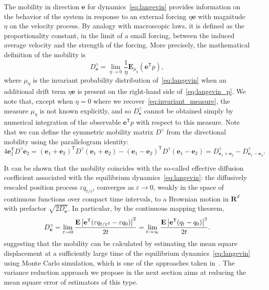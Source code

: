 \documentclass[11pt,a4paper]{article}
\newcommand{\expect}[0]{\mathbf{E}}
\newcommand{\real}{\mathbf R}
\newcommand{\vect}[1]{\boldsymbol{\mathbf #1}}
\renewcommand{\t}{\mathsf T}
\theoremstyle{plain}
\numberwithin{equation}{section}
\begin{document}
The mobility in direction $\vect e$ for dynamics~\eqref{eq:langevin} provides information on the behavior of the system
in response to an external forcing $\eta \vect e$ with magnitude~$\eta$ on the velocity process.
By analogy with macroscopic laws,
it is defined as the proportionality constant,
in the limit of a small forcing,
between the induced average velocity and the strength  of the forcing.
More precisely,
the mathematical definition of the mobility is
\[
    D^{\gamma}_{\vect e} = \lim_{\eta \to 0} \frac{1}{\eta}\expect_{\mu_{\eta}} (\vect e^\t p),
\]
where $\mu_{\eta}$ is the invariant probability distribution of~\eqref{eq:langevin} when
an additional drift term $\eta \vect e$ is present on the right-hand side of~\eqref{eq:langevin_p}.
We note that, except when $\eta = 0$ where we recover~\eqref{eq:invariant_measure},
the measure $\mu_{\eta}$ is not known explicitly,
and so $D^{\gamma}_{\vect e}$ cannot be obtained simply by numerical integration of the observable $\vect e^\t p$ with respect to this measure.
Note that we can define the symmetric mobility matrix $D^{\gamma}$ from the directional mobility
using the parallelogram identity:
\[
    4 \vect e_1^\t D^{\gamma} \vect e_2
    = (\vect e_1 + \vect e_2) ^\t D^{\gamma} (\vect e_1 + \vect e_2)
    - (\vect e_1 - \vect e_2) ^\t D^{\gamma} (\vect e_1 - \vect e_2)
    = D^{\gamma}_{\vect e_1 + \vect e_2} - D^{\gamma}_{\vect e_1 - \vect e_2}.
\]

It can be shown that the mobility coincides with the so-called effective diffusion coefficient associated with the equilibrium dynamics~\eqref{eq:langevin}:
the diffusively rescaled position process $\varepsilon q_{t/\varepsilon^2}$ converges as $\varepsilon \to 0$,
weakly in the space of continuous functions over compact time intervals,
to a Brownian motion in $\real^d$ with prefactor $\sqrt{2 D^{\gamma}_{\vect e}}$.
In particular, by the continuous mapping theorem,
\begin{equation}
    \label{eq:einsteins_formula}
    D^{\gamma}_{\vect e}
    =\lim_{\varepsilon \to 0} \frac{\expect\abs{\vect e^\t (\varepsilon q_{t/\varepsilon^2} - \varepsilon q_0)}^2}{2 t}
    =\lim_{t \to \infty} \frac{\expect \abs{\vect e^\t (q_t - q_0)}^2}{2t}.
\end{equation}
suggesting that the mobility can be calculated by
estimating the mean square displacement at a sufficiently large time of the equilibrium dynamics~\eqref{eq:langevin}
using Monte Carlo simulation,
which is one of the approaches taken in~\cite{MR2427108}.
The variance reduction approach we propose in the next section aims at reducing the mean square error of estimators of this type.
\end{document}
